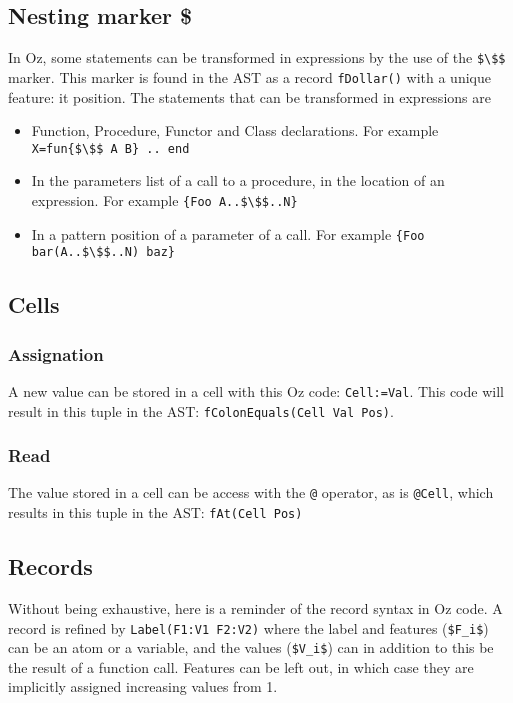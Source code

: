 \documentclass[a4paper]{memoir}
\begin{document}
\subsection{Nesting marker \$}\label{sec:input:nestingmarker}
In Oz, some statements can be transformed in expressions by the use of the
\lstinline[mathescape]!$\$$!
marker. This marker is found in the AST as a record \lstinline!fDollar()! with a unique
feature: it position.
The statements that can be transformed in expressions are
\begin{itemize}
  \item Function, Procedure, Functor and Class declarations. For example
    \lstinline[mathescape]!X=fun{$\$$ A B} .. end!
  \item In the parameters list of a call to a procedure, in the location of an
    expression. For example \lstinline[mathescape]!{Foo A..$\$$..N}!
  \item In a pattern position of a parameter of a call. For example
    \lstinline[mathescape]!{Foo bar(A..$\$$..N) baz}!
\end{itemize}

\subsection{Cells}\label{sec:input:cells}
\subsubsection{Assignation}
A new value can be stored in a cell with this Oz code: \lstinline!Cell:=Val!. This code will result in 
this tuple in the AST: \lstinline!fColonEquals(Cell Val Pos)!. %
\subsubsection{Read}
The value stored in a cell can be access with the \lstinline!@! operator, as is
\lstinline!@Cell!, which results in this tuple in the AST: 
\lstinline!fAt(Cell Pos)!
\subsection{Records}\label{sec:input:records}
Without being exhaustive, here is a reminder of the record syntax in Oz code. A
record is refined by \lstinline!Label(F1:V1 F2:V2)! where the label and features
(\lstinline[mathescape]!$F_i$!) can be an atom or a variable, and the values
(\lstinline[mathescape]!$V_i$!) can in addition to this be the result of a function call. Features can be left out, in which case they are implicitly assigned increasing values from 1.
\end{document}

